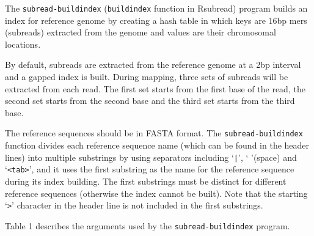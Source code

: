 \documentclass[12pt]{report}
\newcommand{\code}[1]{{\small\texttt{#1}}}
\newcommand{\Rsubread}{\textsf{Rsubread}}
\begin{document}
The \code{subread-buildindex} (\code{buildindex} function in \Rsubread) program builds an index for reference genome by creating a hash table in which keys are 16bp mers (subreads) extracted from the genome and values are their chromosomal locations.

By default, subreads are extracted from the reference genome at a 2bp interval and a gapped index is built.
During mapping, three sets of subreads will be extracted from each read.
The first set starts from the first base of the read, the second set starts from the second base and the third set starts from the third base.

The reference sequences should be in FASTA format.
The \code{subread-buildindex} function divides each reference sequence name (which can be found in the header lines) into multiple substrings by using separators including `\code{|}', ` '(space) and `\code{<tab>}', and it uses the first substring as the name for the reference sequence during its index building.
The first substrings must be distinct for different reference sequences (otherwise the index cannot be built).
Note that the starting `\code{>}' character in the header line is not included in the first substrings.

Table 1 describes the arguments used by the \code{subread-buildindex} program.

\newpage
\end{document}
